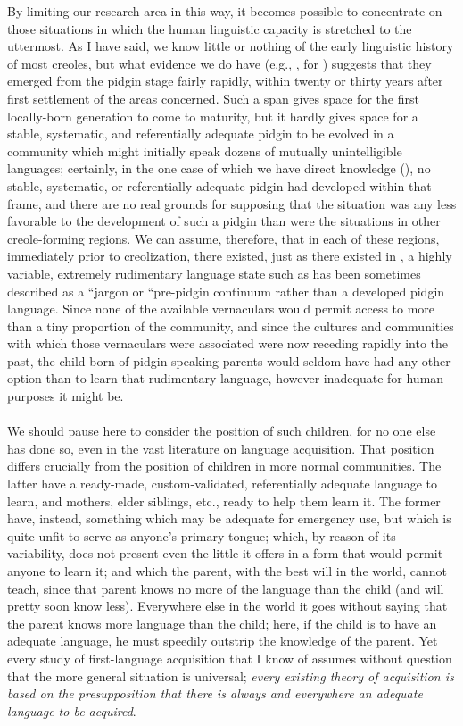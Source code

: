By limiting our research area in this way, it becomes possible to concentrate on those situations in which the human linguistic capacity is stretched to the uttermost. As I have said, we know little or nothing of the early linguistic history of most creoles, but what evidence we do have (e.g., \citealt{Rens1953}, for ) suggests that they emerged from the pidgin stage fairly rapidly, within twenty or thirty years after first settlement of the areas concerned. Such a  span gives space for the first locally-born generation to come to maturity, but it hardly gives space for a stable, systematic, and referentially adequate pidgin to be evolved in a community which might initially speak dozens of mutually unintelligible languages; certainly, in the one case of which we have direct knowledge (), no stable, systematic, or referentially
adequate pidgin had developed within that  frame, and there are no real grounds for supposing that the  situation was any less favorable to the development of such a pidgin than were the situations in other creole-forming regions. We can assume, therefore, that in each of these regions, immediately prior to creolization, there existed, just as there existed in , a highly variable, extremely rudimentary language state such as has been sometimes described as a ``jargon or ``pre-pidgin continuum rather than a developed pidgin language. Since none of the available vernaculars would permit access to more than a tiny proportion of the community, and since the cultures and communities with which those vernaculars were associated were now receding rapidly into the past, the child born of pidgin-speaking parents would seldom have had any other option than to learn that rudi\-mentary language, however inadequate for human purposes it might be.\\\\


We should pause here to consider the position of such children, for no one else has done so, even in the vast literature on language acquisition. That position differs crucially from the position of children in more normal communities. The latter have a ready-made, custom-validated, referentially adequate language to learn, and mothers, elder siblings, etc., ready to help them learn it. The former have, instead, something which may be adequate for emergency use, but which is quite unfit to serve as anyone's primary tongue; which, by reason of its variability, does not present even the little it offers in a form that would permit anyone to learn it; and which the parent, with the best will in the world, cannot teach, since that parent knows no more of the language than the child (and will pretty soon know less). Every\-where else in the world it goes without saying that the parent knows more language than the child; here, if the child is to have an adequate language, he must speedily outstrip the knowledge of the parent. Yet every study of first-language acquisition that I know of assumes without question that the more general situation is universal; \textit{every existing theory of acquisition is based on the presupposition that there is always and everywhere an adequate language to be acquired}.

